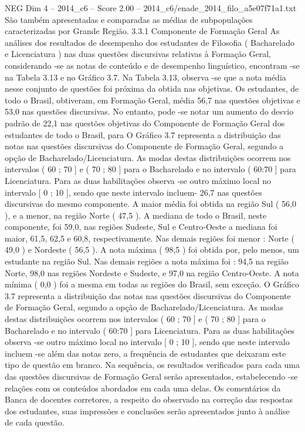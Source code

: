 \begin{textsample}{NEG Dim 4 – 2014\_c6 – Score 2.00 – 2014\_c6/enade\_2014\_filo\_a5e07f71a1.txt}
São também apresentadas e comparadas as médias de subpopulações caracterizadas por Grande Região. 3.3.1 Componente de Formação Geral As análises dos resultados de desempenho dos estudantes de Filosofia ( Bacharelado e Licenciatura ) nas duas questões discursivas relativas à Formação Geral, considerando -se as notas de conteúdo e de desempenho linguístico, encontram -se na Tabela 3.13 e no Gráfico 3.7.
Na Tabela 3.13, observa -se que a nota média nesse conjunto de questões foi próxima da obtida nas objetivas.
Os estudantes, de todo o Brasil, obtiveram, em Formação Geral, média 56,7 nas questões objetivas e 53,0 nas questões discursivas.
No entanto, pode -se notar um aumento do desvio padrão de 22,1 nas questões objetivas do Componente de Formação Geral dos estudantes de todo o Brasil, para O Gráfico 3.7 representa a distribuição das notas nas questões discursivas do Componente de Formação Geral, segundo a opção de Bacharelado/Licenciatura.
As modas destas distribuições ocorrem nos intervalos ( 60 ; 70 ] e ( 70 ; 80 ] para o Bacharelado e no intervalo ( 60:70 ] para Licenciatura.
Para as duas habilitações observa -se outro máximo local no intervalo [ 0 ; 10 ], sendo que neste intervalo incluem- 26,7 nas questões discursivas do mesmo componente.
A maior média foi obtida na região Sul ( 56,0 ), e a menor, na região Norte ( 47,5 ).
A mediana de todo o Brasil, neste componente, foi 59,0, nas regiões Sudeste, Sul e Centro-Oeste a mediana foi maior, 61,5, 62,5 e 60,8, respectivamente.
Nas demais regiões foi menor : Norte ( 49,0 ) e Nordeste ( 56,5 ).
A nota máxima ( 98,5 ) foi obtida por, pelo menos, um estudante na região Sul.
Nas demais regiões a nota máxima foi : 94,5 na região Norte, 98,0 nas regiões Nordeste e Sudeste, e 97,0 na região Centro-Oeste.
A nota mínima ( 0,0 ) foi a mesma em todas as regiões do Brasil, sem exceção.
O Gráfico 3.7 representa a distribuição das notas nas questões discursivas do Componente de Formação Geral, segundo a opção de Bacharelado/Licenciatura.
As modas destas distribuições ocorrem nos intervalos ( 60 ; 70 ] e ( 70 ; 80 ] para o Bacharelado e no intervalo ( 60:70 ] para Licenciatura.
Para as duas habilitações observa -se outro máximo local no intervalo [ 0 ; 10 ], sendo que neste intervalo incluem -se além das notas zero, a frequência de estudantes que deixaram este tipo de questão em branco.
Na sequência, os resultados verificados para cada uma das questões discursivas de Formação Geral serão apresentados, estabelecendo -se relações com os conteúdos abordados em cada uma delas.
Os comentários da Banca de docentes corretores, a respeito do observado na correção das respostas dos estudantes, suas impressões e conclusões serão apresentados junto à análise de cada questão.

\end{textsample}
